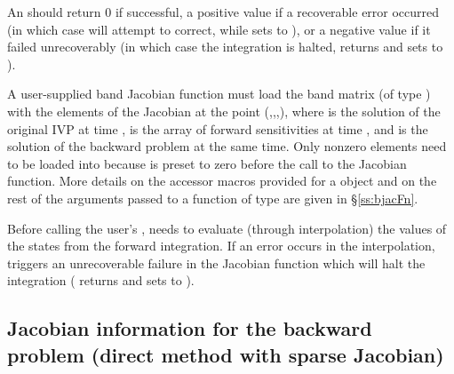 {
  An  should return 0 if successful, a positive value if a recoverable
  error occurred (in which case {\idas} will attempt to correct, while {\idaband} sets
   to ), or a negative 
  value if it failed unrecoverably (in which case the integration is halted, 
  returns  and {\idadense} sets  to
  ).
}
{
  A user-supplied band Jacobian function must load the band matrix 
  (of type ) with the elements of the Jacobian at the
  point (,,,), where  is the solution
  of the original IVP at time ,  is the array of forward
  sensitivities at time , and  is the solution of the
  backward problem at the same time.  
  Only nonzero elements need to be loaded into
   because  is preset to zero before the call to the
  Jacobian function. More details on the accessor macros provided for
  a  object and on the rest of the arguments passed to a function
  of type  are given in \S\ref{ss:bjacFn}.

  {\warn}Before calling the user's , {\idas} needs to evaluate
  (through interpolation) the values of the states from the forward integration. 
  If an error occurs in the interpolation, {\idas} triggers an unrecoverable
  failure in the Jacobian function which will halt the integration
  ( returns  and {\idaband} sets  to
  ).
}


\subsection{Jacobian information for the backward problem 
  (direct method with sparse Jacobian)}\label{ss:sparsejac_b}
  
